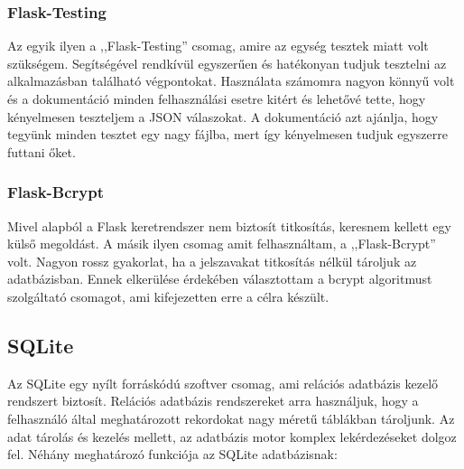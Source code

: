 \documentclass{thesis-ekf}
\theoremstyle{definition}
\theoremstyle{remark}
\begin{document}
\subsubsection{Flask-Testing}

Az egyik ilyen a ,,Flask-Testing'' csomag, amire az egység tesztek miatt volt szükségem.
Segítségével rendkívül egyszerűen és hatékonyan tudjuk tesztelni az alkalmazásban található végpontokat.
Használata számomra nagyon könnyű volt és a dokumentáció minden felhasználási esetre kitért és lehetővé tette, hogy kényelmesen teszteljem a JSON válaszokat.
A dokumentáció azt ajánlja, hogy tegyünk minden tesztet egy nagy fájlba, mert így kényelmesen tudjuk egyszerre futtani őket.

\subsubsection{Flask-Bcrypt}

Mivel alapból a Flask keretrendszer nem biztosít titkosítás, keresnem kellett egy külső megoldást.
A másik ilyen csomag amit felhasználtam, a ,,Flask-Bcrypt'' volt.
Nagyon rossz gyakorlat, ha a jelszavakat titkosítás nélkül tároljuk az adatbázisban.
Ennek elkerülése érdekében választottam a bcrypt algoritmust szolgáltató csomagot, ami kifejezetten erre a célra készült.

\subsection{SQLite}

Az SQLite egy nyílt forráskódú szoftver csomag, ami relációs adatbázis kezelő rendszert biztosít.
Relációs adatbázis rendszereket arra használjuk, hogy a felhasználó által meghatározott rekordokat nagy méretű táblákban tároljunk.
Az adat tárolás és kezelés mellett, az adatbázis motor komplex lekérdezéseket dolgoz fel.
Néhány meghatározó funkciója az SQLite adatbázisnak:
\end{document}

